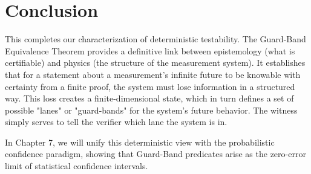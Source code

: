 \documentclass[12pt]{article}
\theoremstyle{definition}
\theoremstyle{plain}
\begin{document}
\section{Conclusion}
This completes our characterization of deterministic testability. The Guard-Band Equivalence Theorem provides a definitive link between epistemology (what is certifiable) and physics (the structure of the measurement system). It establishes that for a statement about a measurement's infinite future to be knowable with certainty from a finite proof, the system must lose information in a structured way. This loss creates a finite-dimensional state, which in turn defines a set of possible "lanes" or "guard-bands" for the system's future behavior. The witness simply serves to tell the verifier which lane the system is in.

In Chapter 7, we will unify this deterministic view with the probabilistic confidence paradigm, showing that Guard-Band predicates arise as the zero-error limit of statistical confidence intervals.
\end{document}
